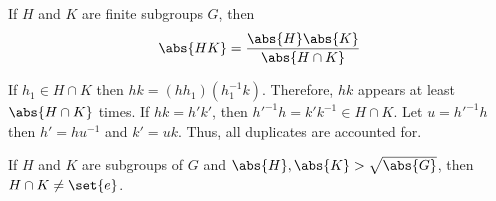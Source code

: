 \begin{lemma}
    If \(H\) and \(K\) are finite subgroups \(G\), then 
    \begin{equation*}
        \abs{HK} = \dfrac{\abs{H} \abs{K}}{\abs{H \cap K}}
    \end{equation*}
\end{lemma}

\begin{prooflemma}
    If \(h_1 \in H \cap K\) then \(hk = (hh_1)(h_1^{-1}k)\). Therefore, \(hk\) appears at least \(\abs{H \cap K}\) times. If \(hk = h'k'\), then \(h'^{-1}h = k' k^{-1} \in H \cap K\). Let \(u = h'^{-1}h\) then \(h' = hu^{-1}\) and \(k' = uk\). Thus, all duplicates are accounted for.
\end{prooflemma}

\begin{corollary}
    If \(H\) and \(K\) are subgroups of \(G\) and \(\abs{H},\abs{K} > \sqrt{\abs{G}}\), then \(H \cap K \neq \set{e}\).
\end{corollary}

